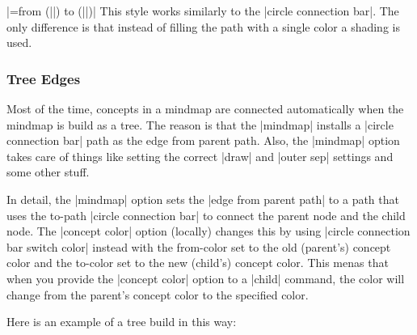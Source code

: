 \begin{itemize}
  |=from (||) to (||)|
  This style works similarly to the |circle connection bar|. The only
  difference is that instead of filling the path with a single color a
  shading is used.
\begin{codeexample}[]
\end{codeexample}
\end{itemize}


\subsubsection{Tree Edges}

Most of the time, concepts in a mindmap are connected automatically
when the mindmap is build as a tree. The reason is that the |mindmap|
installs a |circle connection bar| path as the edge from parent
path. Also, the |mindmap| option takes care of things like setting the
correct |draw| and |outer sep| settings and some other stuff.

In detail, the |mindmap| option sets the |edge from parent path| to a
path that uses the to-path |circle connection bar| to connect the parent node
and the child node. The |concept color| option (locally) changes this
by using |circle connection bar switch color| instead with the
from-color set to the old (parent's) concept color and the to-color
set to the new (child's) concept color. This menas that when you
provide the |concept color| option to a |child| command, the color
will change from the parent's concept color to the specified color.

Here is an example of a tree build in this way:

\begin{codeexample}[]
\end{codeexample}



